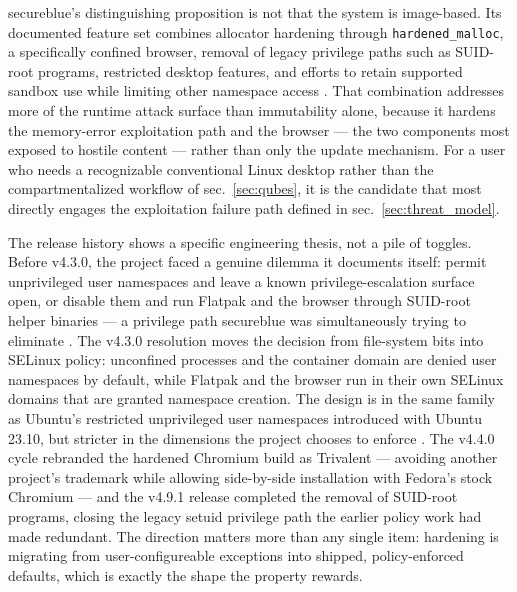 \documentclass[
  english,
  9pt,
]{extarticle}
\begin{document}
secureblue's distinguishing proposition is not that the system is
image-based. Its documented feature set combines allocator hardening
through \texttt{hardened\_malloc}, a specifically confined browser,
removal of legacy privilege paths such as SUID-root programs, restricted
desktop features, and efforts to retain supported sandbox use while
limiting other namespace access \citep{secureblue_features}. That
combination addresses more of the runtime attack surface than
immutability alone, because it hardens the memory-error exploitation
path and the browser --- the two components most exposed to hostile
content --- rather than only the update mechanism. For a user who needs
a recognizable conventional Linux desktop rather than the
compartmentalized workflow of sec.~\ref{sec:qubes}, it is the candidate
that most directly engages the exploitation failure path defined in
sec.~\ref{sec:threat_model}.

The release history shows a specific engineering thesis, not a pile of
toggles. Before v4.3.0, the project faced a genuine dilemma it documents
itself: permit unprivileged user namespaces and leave a known
privilege-escalation surface open, or disable them and run Flatpak and
the browser through SUID-root helper binaries --- a privilege path
secureblue was simultaneously trying to eliminate
\citep{secureblue_v430}. The v4.3.0 resolution moves the decision from
file-system bits into SELinux policy: unconfined processes and the
container domain are denied user namespaces by default, while Flatpak
and the browser run in their own SELinux domains that are granted
namespace creation. The design is in the same family as Ubuntu's
restricted unprivileged user namespaces introduced with Ubuntu 23.10,
but stricter in the dimensions the project chooses to enforce
\citep{secureblue_v430}. The v4.4.0 cycle rebranded the hardened
Chromium build as Trivalent --- avoiding another project's trademark
while allowing side-by-side installation with Fedora's stock Chromium
\citep{secureblue_features} --- and the v4.9.1 release completed the
removal of SUID-root programs, closing the legacy setuid privilege path
the earlier policy work had made redundant. The direction matters more
than any single item: hardening is migrating from user-configureable
exceptions into shipped, policy-enforced defaults, which is exactly the
shape the  property rewards.
\end{document}
